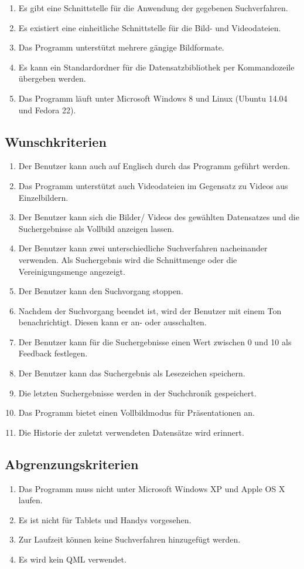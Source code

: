 \begin{enumerate} [label=\bfseries /MK \arabic*0/, leftmargin=*]
\item Es gibt eine Schnittstelle für die Anwendung der gegebenen \gls{Suchverfahren}.
\item Es existiert eine einheitliche Schnittstelle für die Bild- und Videodateien.
\item Das Programm unterstützt mehrere gängige Bildformate.
\item Es kann ein Standardordner für die Datensatzbibliothek per Kommandozeile übergeben werden.
\item Das Programm läuft unter Microsoft Windows 8 und Linux (Ubuntu 14.04 und Fedora 22).
\end{enumerate}
\subsection{Wunschkriterien}
\begin{enumerate} [label=\bfseries /WK \arabic*0/, leftmargin=*]
\item Der Benutzer kann auch auf Englisch durch das Programm geführt werden.
\item Das Programm unterstützt auch Videodateien im Gegensatz zu Videos aus Einzelbildern.
\item Der Benutzer kann sich die Bilder/ Videos des gewählten Datensatzes und die Suchergebnisse als Vollbild anzeigen lassen.
\item Der Benutzer kann zwei unterschiedliche \gls{Suchverfahren} nacheinander verwenden. Als Suchergebnis wird die Schnittmenge oder die Vereinigungsmenge angezeigt.
\item Der Benutzer kann den Suchvorgang stoppen.
\item Nachdem der Suchvorgang beendet ist, wird der Benutzer mit einem Ton benachrichtigt. Diesen kann er an- oder ausschalten.
\item Der Benutzer kann für die Suchergebnisse einen Wert zwischen 0 und 10 als \gls{Feedback} festlegen.
\item Der Benutzer kann das Suchergebnis als \gls{Lesezeichen} speichern.
\item Die letzten Suchergebnisse werden in der \gls{Suchchronik} gespeichert.
\item Das Programm bietet einen Vollbildmodus für Präsentationen an.
\item Die Historie der zuletzt verwendeten Datensätze wird erinnert.
\end{enumerate}
\subsection{Abgrenzungskriterien}
\begin{enumerate} [label=\bfseries /AK \arabic*0/, leftmargin=*]
\item Das Programm muss nicht unter Microsoft Windows XP und Apple OS X laufen. 
\item Es ist nicht für Tablets und Handys vorgesehen.
\item Zur Laufzeit können keine \gls{Suchverfahren} hinzugefügt werden.
\item Es wird kein QML verwendet.
\end{enumerate}
\pagebreak
